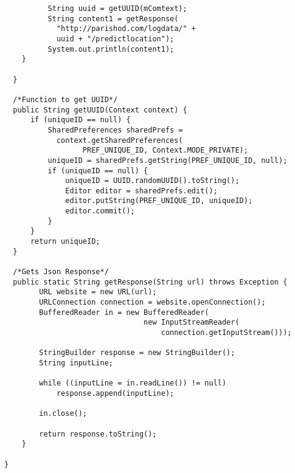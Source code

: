 \documentclass[conference]{IEEEtran}
\begin{document}
\begin{lstlisting}
          String uuid = getUUID(mComtext);
          String content1 = getResponse(
            "http://parishod.com/logdata/" + 
            uuid + "/predictlocation");
          System.out.println(content1);           
    }
 
  }
  
  /*Function to get UUID*/
  public String getUUID(Context context) {
      if (uniqueID == null) {
          SharedPreferences sharedPrefs = 
            context.getSharedPreferences(
                  PREF_UNIQUE_ID, Context.MODE_PRIVATE);
          uniqueID = sharedPrefs.getString(PREF_UNIQUE_ID, null);
          if (uniqueID == null) {
              uniqueID = UUID.randomUUID().toString();
              Editor editor = sharedPrefs.edit();
              editor.putString(PREF_UNIQUE_ID, uniqueID);
              editor.commit();
          }
      }
      return uniqueID;
  }
  
  /*Gets Json Response*/
  public static String getResponse(String url) throws Exception {
        URL website = new URL(url);
        URLConnection connection = website.openConnection();
        BufferedReader in = new BufferedReader(
                                new InputStreamReader(
                                    connection.getInputStream()));

        StringBuilder response = new StringBuilder();
        String inputLine;

        while ((inputLine = in.readLine()) != null) 
            response.append(inputLine);

        in.close();

        return response.toString();
    }
  
}

\end{lstlisting}
\end{document}
